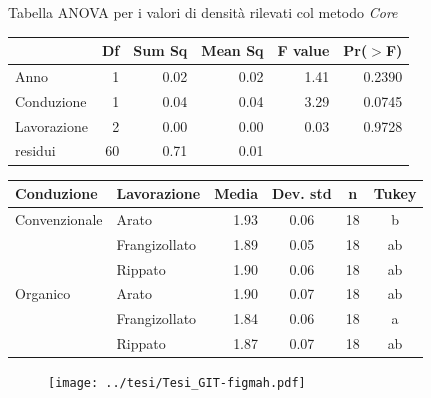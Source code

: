 \documentclass[10pt]{beamer}
\begin{document}
\begin{frame}{Tabella ANOVA per i valori di densità rilevati col metodo \emph{Core}} 
  \begin{table}[ht]
    \centering
    \label{tab:anova del modello}
    \begin{tabular}{lrrrrr}
      \hline
      & Df & Sum Sq & Mean Sq & F value & Pr($>$F) \\ 
      \hline
      Anno & 1 & 0.02 & 0.02 & 1.41 & 0.2390 \\ 
      Conduzione & 1 & 0.04 & 0.04 & 3.29 & 0.0745 \\ 
      Lavorazione & 2 & 0.00 & 0.00 & 0.03 & 0.9728 \\ 
      residui & 60 & 0.71 & 0.01 &  &  \\ 
      \hline
    \end{tabular}
  \end{table}
\end{frame}


\begin{frame}[label=Clod]
\hyperlink{densita}{}
  \footnotesize
  \begin{table}[ht]
    \centering
    \begin{tabular}{llrccc}
      \hline
      Conduzione & Lavorazione & Media & Dev. std & n & Tukey \\ 
      \hline
      Convenzionale & Arato & 1.93 & 0.06 &  18 & b \\ 
                 & Frangizollato & 1.89 & 0.05 &  18 & ab \\ 
                 & Rippato & 1.90 & 0.06 &  18 & ab \\ 
      Organico & Arato & 1.90 & 0.07 &  18 & ab \\ 
                 & Frangizollato & 1.84 & 0.06 &  18 & a \\ 
                 & Rippato & 1.87 & 0.07 &  18 & ab \\ 
      \hline
    \end{tabular}
    \label{tab:RiassuntoDensitaSpinta}
  \end{table}
\end{frame}

\begin{frame}
  \vspace{1.5cm}
  \begin{figure}
    \texttt{[image: ../tesi/Tesi\_GIT-figmah.pdf]}
  \end{figure}
\end{frame}
\end{document}
